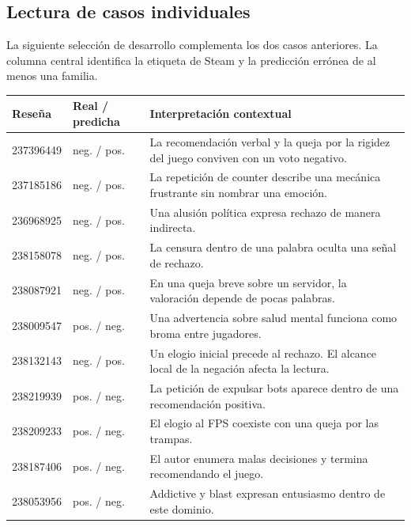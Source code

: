 \documentclass[11pt,letterpaper]{article}
\begin{document}
\subsection*{Lectura de casos individuales}
La siguiente selección de desarrollo complementa los dos casos anteriores. La columna central identifica la etiqueta de Steam y la predicción errónea de al menos una familia.
\begin{center}\small\begin{tabular}{llp{9.1cm}}\toprule
Reseña & Real / predicha & Interpretación contextual\\\midrule
237396449 & neg. / pos. & La recomendación verbal y la queja por la rigidez del juego conviven con un voto negativo.\\
237185186 & neg. / pos. & La repetición de counter describe una mecánica frustrante sin nombrar una emoción.\\
236968925 & neg. / pos. & Una alusión política expresa rechazo de manera indirecta.\\
238158078 & neg. / pos. & La censura dentro de una palabra oculta una señal de rechazo.\\
238087921 & neg. / pos. & En una queja breve sobre un servidor, la valoración depende de pocas palabras.\\
238009547 & pos. / neg. & Una advertencia sobre salud mental funciona como broma entre jugadores.\\
238132143 & neg. / pos. & Un elogio inicial precede al rechazo. El alcance local de la negación afecta la lectura.\\
238219939 & pos. / neg. & La petición de expulsar bots aparece dentro de una recomendación positiva.\\
238209233 & pos. / neg. & El elogio al FPS coexiste con una queja por las trampas.\\
238187406 & pos. / neg. & El autor enumera malas decisiones y termina recomendando el juego.\\
238053956 & pos. / neg. & Addictive y blast expresan entusiasmo dentro de este dominio.\\\bottomrule\end{tabular}\end{center}
\newpage
\end{document}
